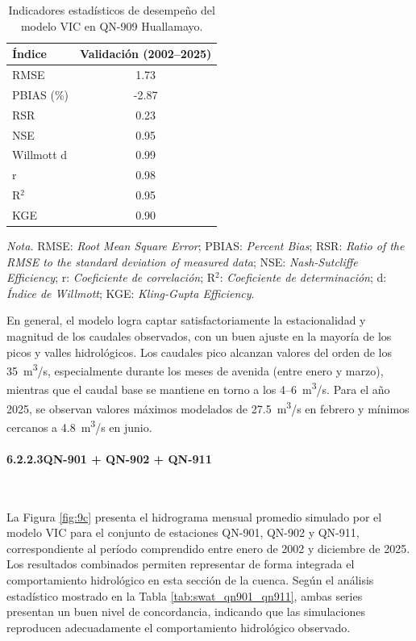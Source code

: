 \begin{table}[ht]
\centering
\caption{Indicadores estadísticos de desempeño del modelo VIC en QN-909 Huallamayo.}
\label{tab:swat_qn909}
\small
\begin{tabular}{lc}
\toprule
\textbf{Índice} & \textbf{Validación (2002–2025)} \\
\midrule
RMSE & 1.73 \\
PBIAS (\%) & -2.87 \\
RSR & 0.23 \\
NSE & 0.95 \\
Willmott d & 0.99 \\
r & 0.98 \\
R$^2$ & 0.95 \\
KGE & 0.90 \\
\bottomrule
\end{tabular}
\vspace{2pt}
\begin{minipage}{0.9\textwidth}
\small 
\textit{Nota.} RMSE: \textit{Root Mean Square Error}; PBIAS: \textit{Percent
Bias}; RSR: \textit{Ratio of the RMSE to the standard deviation of measured
data}; NSE: \textit{Nash-Sutcliffe Efficiency}; r: \textit{Coeficiente de
correlación}; R$^2$: \textit{Coeficiente de determinación}; d: \textit{Índice de
Willmott}; KGE: \textit{Kling-Gupta Efficiency}.
\end{minipage}
\end{table}

En general, el modelo logra captar satisfactoriamente la estacionalidad y
magnitud de los caudales observados, con un buen ajuste en la mayoría de los
picos y valles hidrológicos. Los caudales pico alcanzan valores del orden de los
35~m\textsuperscript{3}/s, especialmente durante los meses de avenida (entre
enero y marzo), mientras que el caudal base se mantiene en torno a los
4–6~m\textsuperscript{3}/s. Para el año 2025, se observan valores máximos
modelados de 27.5~m\textsuperscript{3}/s en febrero y mínimos cercanos a
4.8~m\textsuperscript{3}/s en junio.

\paragraph{6.2.2.3\quad QN-901 + QN-902 + QN-911}\mbox{}\\
La Figura \ref{fig:9c} presenta el hidrograma mensual promedio simulado por el
modelo VIC para el conjunto de estaciones QN-901, QN-902 y QN-911,
correspondiente al período comprendido entre enero de 2002 y diciembre de 2025.
Los resultados combinados permiten representar de forma integrada el
comportamiento hidrológico en esta sección de la cuenca. Según el análisis
estadístico mostrado en la Tabla \ref{tab:swat_qn901_qn911}, ambas series
presentan un buen nivel de concordancia, indicando que las simulaciones
reproducen adecuadamente el comportamiento hidrológico observado.

